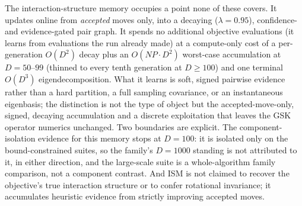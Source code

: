 The interaction-structure memory occupies a point none of these covers. It
updates online from \emph{accepted} moves only, into a decaying
($\lambda = 0.95$), confidence- and evidence-gated pair
graph. %
It spends no additional objective evaluations (it learns from evaluations the
run already made) at a compute-only cost of a per-generation $O(D^2)$ decay
plus an $O(\mathit{NP} \cdot D^{2})$ worst-case accumulation at $D = 50$--$99$
(thinned to every tenth generation at $D \ge 100$) and one terminal $O(D^3)$
eigendecomposition. %
What it learns is soft, signed pairwise evidence rather than a hard partition, a
full sampling covariance, or an instantaneous eigenbasis; the distinction is not
the type of object but the accepted-move-only, signed, decaying accumulation and
a discrete exploitation that leaves the GSK operator numerics unchanged. Two
boundaries are explicit. The component-isolation evidence for this memory stops
at $D = 100$: it is isolated only on the bound-constrained suites, so the
family's $D = 1000$ standing is not attributed to it, in either direction,
and the large-scale suite is a whole-algorithm family comparison, not a
component contrast. %
And ISM is not claimed to recover the objective's true interaction structure
or to confer rotational invariance; it accumulates heuristic evidence from
strictly improving accepted moves.

